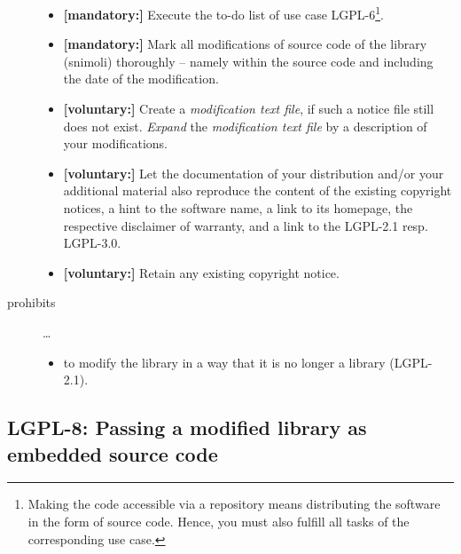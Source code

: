\begin{description}
\begin{itemize}
  \item \textbf{[mandatory:]} Execute the to-do list of use case LGPL-6\footnote{
  Making the code accessible via a repository means distributing the software in
  the form of source code. Hence, you must also fulfill all tasks of the
  corresponding use case.}.

  \item \textbf{[mandatory:]} Mark all modifications of source code of the
  library (snimoli) thoroughly -- namely within the source code and including
  the date of the modification.

  \item \textbf{[voluntary:]} Create a \emph{modification text file}, if such a
  notice file still does not exist. \emph{Expand} the \emph{modification text
  file} by a description of your modifications.

  \item \textbf{[voluntary:]} Let the documentation of your distribution and/or
  your additional material also reproduce the content of the existing
  copyright notices, a hint to the software name, a link to its homepage,
  the respective disclaimer of warranty, and a link to the LGPL-2.1 resp.
  LGPL-3.0.
  
  \item \textbf{[voluntary:]} Retain any existing copyright notice. 
  
\end{itemize}

\item[prohibits] \ldots
\begin{itemize}
  \item to modify the library in a way that it is no longer a library
  (LGPL-2.1).
\end{itemize}

\end{description}

\subsection{LGPL-8: Passing a modified library as embedded source code}
\label{OSUC-10-LGPL}

